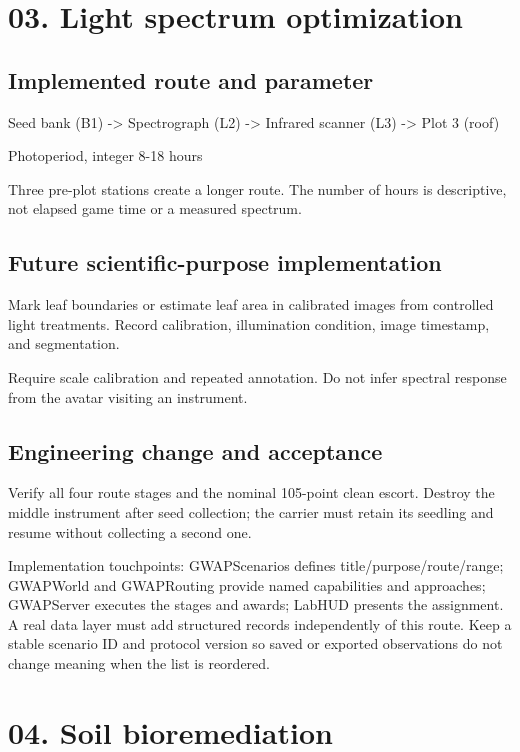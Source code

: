 \section{03.\allowbreak{} Light spectrum optimization}
\subsection{Implemented route and parameter}
Seed bank (B1) -> Spectrograph (L2) -> Infrared scanner (L3) -> Plot 3 (roof)

Photoperiod, integer 8-18 hours

Three pre-plot stations create a longer route.\allowbreak{} The number of hours is descriptive, not elapsed game time or a measured spectrum.\allowbreak{}

\subsection{Future scientific-purpose implementation}
Mark leaf boundaries or estimate leaf area in calibrated images from controlled light treatments.\allowbreak{} Record calibration, illumination condition, image timestamp, and segmentation.\allowbreak{}

Require scale calibration and repeated annotation.\allowbreak{} Do not infer spectral response from the avatar visiting an instrument.\allowbreak{}

\subsection{Engineering change and acceptance}
Verify all four route stages and the nominal 105-point clean escort.\allowbreak{} Destroy the middle instrument after seed collection; the carrier must retain its seedling and resume without collecting a second one.\allowbreak{}

Implementation touchpoints: GWAPScenarios defines title/\allowbreak{}purpose/\allowbreak{}route/\allowbreak{}range; GWAPWorld and GWAPRouting provide named capabilities and approaches; GWAPServer executes the stages and awards; LabHUD presents the assignment.\allowbreak{} A real data layer must add structured records independently of this route.\allowbreak{} Keep a stable scenario ID and protocol version so saved or exported observations do not change meaning when the list is reordered.\allowbreak{}

\section{04.\allowbreak{} Soil bioremediation}
